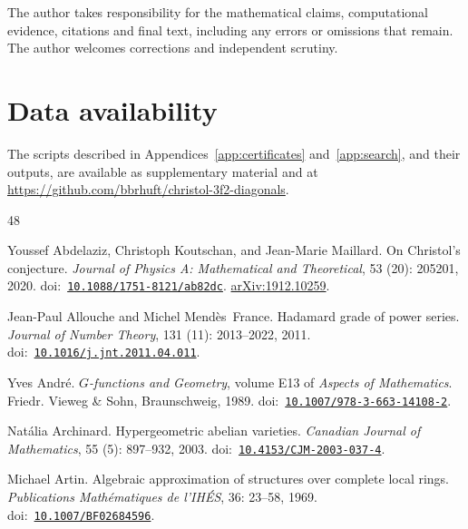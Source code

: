 \documentclass[11pt]{amsart}
\theoremstyle{definition}
\theoremstyle{remark}
\numberwithin{equation}{section}
\begin{document}
The author takes responsibility for the mathematical claims,
computational evidence, citations and final text, including any
errors or omissions that remain. The author welcomes corrections 
and independent scrutiny.

\section*{Data availability}
The scripts described in Appendices~\ref{app:certificates} and~\ref{app:search}, and their outputs, are available as supplementary material and at \url{https://github.com/bbrhuft/christol-3f2-diagonals}.

\begin{thebibliography}{48}
\providecommand{\natexlab}[1]{#1}
\providecommand{\url}[1]{\texttt{#1}}
\providecommand{\doi}[1]{}
\renewcommand{\doi}[1]{doi:~\href{https://doi.org/#1}{\nolinkurl{#1}}}
\providecommand{\arxiv}[1]{}
\renewcommand{\arxiv}[1]{\href{https://arxiv.org/abs/#1}{arXiv:#1}}

Youssef Abdelaziz, Christoph Koutschan, and Jean-Marie Maillard.
\newblock On {C}hristol's conjecture.
\newblock \emph{Journal of Physics A: Mathematical and Theoretical},
  53 (20): 205201, 2020.
\newblock \doi{10.1088/1751-8121/ab82dc}.
\newblock \arxiv{1912.10259}.

Jean-Paul Allouche and Michel Mend{\`e}s~France.
\newblock Hadamard grade of power series.
\newblock \emph{Journal of Number Theory}, 131 (11):
  2013--2022, 2011.
\newblock \doi{10.1016/j.jnt.2011.04.011}.

Yves Andr{\'e}.
\newblock \emph{{$G$}-functions and Geometry}, volume E13 of \emph{Aspects of
  Mathematics}.
\newblock Friedr. Vieweg \& Sohn, Braunschweig, 1989.
\newblock \doi{10.1007/978-3-663-14108-2}.

Nat{\'a}lia Archinard.
\newblock Hypergeometric abelian varieties.
\newblock \emph{Canadian Journal of Mathematics}, 55 (5):
  897--932, 2003.
\newblock \doi{10.4153/CJM-2003-037-4}.

Michael Artin.
\newblock Algebraic approximation of structures over complete local rings.
\newblock \emph{Publications Math{\'e}matiques de l'IH{\'E}S}, 36:
  23--58, 1969.
\newblock \doi{10.1007/BF02684596}.


\end{thebibliography}
\end{document}
